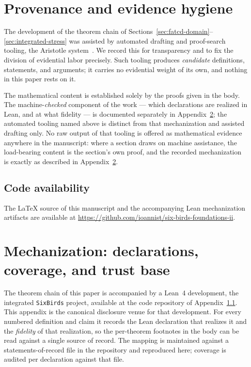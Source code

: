 \documentclass[11pt]{article}
\theoremstyle{definition}
\begin{document}
\appendix
\section{Provenance and evidence hygiene}\label{app:provenance}



The development of the theorem chain of
Sections~\ref{sec:fatcd-domain}--\ref{sec:integrated-stress} was assisted by
automated drafting and proof-search tooling, the Aristotle
system~\citep{Achim2025Aristotle}. We record this for transparency and to fix the
division of evidential labor precisely. Such tooling produces \emph{candidate}
definitions, statements, and arguments; it carries no evidential weight of its
own, and nothing in this paper rests on it.

The mathematical content is established solely by the proofs given in the body.
The machine-\emph{checked} component of the work --- which declarations are
realized in Lean, and at what fidelity --- is documented separately in
Appendix~\ref{app:mechanization}; the automated tooling named above is distinct
from that mechanization and assisted drafting only. No raw output of that tooling
is offered as mathematical evidence anywhere in the manuscript: where a section
draws on machine assistance, the load-bearing content is the section's own proof,
and the recorded mechanization is exactly as described in
Appendix~\ref{app:mechanization}.

\subsection{Code availability}\label{app:code-availability}

The \LaTeX{} source of this manuscript and the accompanying Lean mechanization
artifacts are available at
\url{https://github.com/ioannist/six-birds-foundations-ii}.
 \section{Mechanization: declarations, coverage, and trust base}\label{app:mechanization}

The theorem chain of this paper is accompanied by a Lean~4 development, the
integrated \texttt{SixBirds} project, available at the code repository of
Appendix~\ref{app:code-availability}. This appendix is the canonical disclosure
venue for that development. For every numbered definition and claim it records
the Lean declaration that realizes it and the \emph{fidelity} of that
realization, so the per-theorem footnotes in the body can be read against a
single source of record. The mapping is maintained against a statements-of-record
file in the repository and reproduced here; coverage is audited per declaration
against that file.
\end{document}
